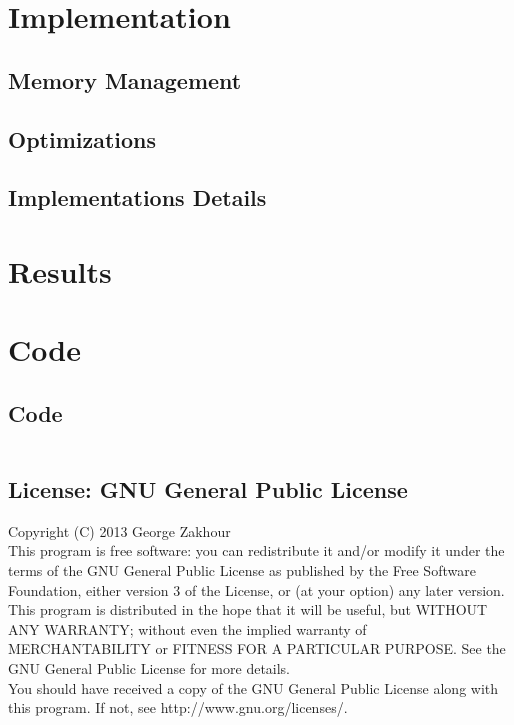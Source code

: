 \documentclass[a4paper, 10pt]{article}
\begin{document}
\newpage

\section{Implementation}
    \subsection{Memory Management}
    \subsection{Optimizations}
    \subsection{Implementations Details}

\newpage
\section{Results}

\newpage
\section{Code}
    \subsection{Code}
\begin{verbatim}
\end{verbatim}
    \subsection{License: GNU General Public License}
    Copyright (C) 2013 George Zakhour\\

    This program is free software: you can redistribute it and/or modify it under
    the terms of the GNU General Public License as published by the Free Software
    Foundation, either version 3 of the License, or (at your option) any later
    version.\\

    This program is distributed in the hope that it will be useful, but WITHOUT ANY
    WARRANTY; without even the implied warranty of MERCHANTABILITY or FITNESS FOR A
    PARTICULAR PURPOSE. See the GNU General Public License for more details.\\

    You should have received a copy of the GNU General Public License along with
    this program. If not, see http://www.gnu.org/licenses/.\\
\end{document}
